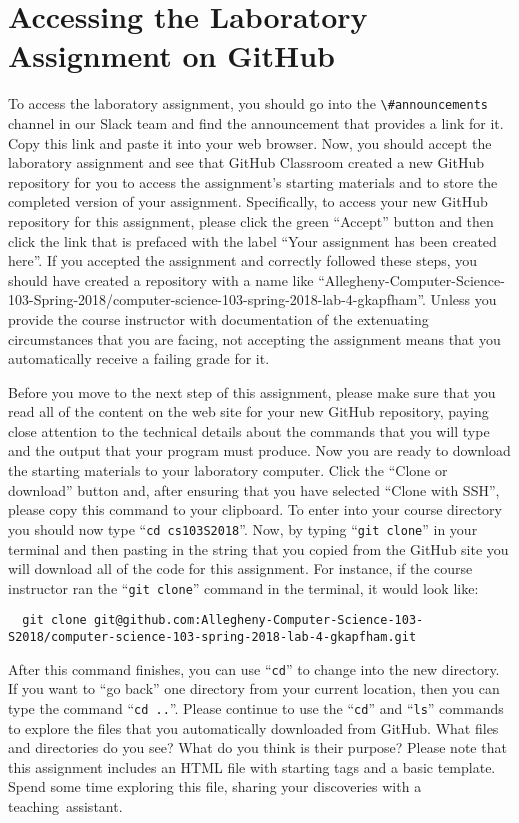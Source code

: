 \documentclass[11pt]{article}
\newcommand{\command}[1]{``\lstinline{#1}''}
\newcommand{\channel}[1]{\lstinline{#1}}
\newcommand{\step}[1]{``{#1}''}
\begin{document}
\section*{Accessing the Laboratory Assignment on GitHub}

To access the laboratory assignment, you should go into the
\channel{\#announcements} channel in our Slack team and find the announcement
that provides a link for it. Copy this link and paste it into your web browser.
Now, you should accept the laboratory assignment and see that GitHub Classroom
created a new GitHub repository for you to access the assignment's starting
materials and to store the completed version of your assignment. Specifically,
to access your new GitHub repository for this assignment, please click the green
``Accept'' button and then click the link that is prefaced with the label ``Your
assignment has been created here''. If you accepted the assignment and correctly
followed these steps, you should have created a repository with a name like
``Allegheny-Computer-Science-103-Spring-2018/computer-science-103-spring-2018-lab-4-gkapfham''.
Unless you provide the course instructor with documentation of the extenuating
circumstances that you are facing, not accepting the assignment means that you
automatically receive a failing grade for it.

Before you move to the next step of this assignment, please make sure that you
read all of the content on the web site for your new GitHub repository, paying
close attention to the technical details about the commands that you will type
and the output that your program must produce. Now you are ready to download the
starting materials to your laboratory computer. Click the ``Clone or download''
button and, after ensuring that you have selected ``Clone with SSH'', please
copy this command to your clipboard. To enter into your course directory you
should now type \command{cd cs103S2018}. Now, by typing \command{git clone} in
your terminal and then pasting in the string that you copied from the GitHub
site you will download all of the code for this assignment. For instance, if the
course instructor ran the \command{git clone} command in the terminal, it would
look like:

\begin{lstlisting}
  git clone git@github.com:Allegheny-Computer-Science-103-S2018/computer-science-103-spring-2018-lab-4-gkapfham.git
\end{lstlisting}

After this command finishes, you can use \command{cd} to change into the new
directory. If you want to \step{go back} one directory from your current
location, then you can type the command \command{cd ..}. Please continue to use
the \command{cd} and \command{ls} commands to explore the files that you
automatically downloaded from GitHub. What files and directories do you see?
What do you think is their purpose? Please note that this assignment includes an
HTML file with starting tags and a basic template. Spend some time exploring
this file, sharing your discoveries with a \mbox{teaching assistant}.
\end{document}
